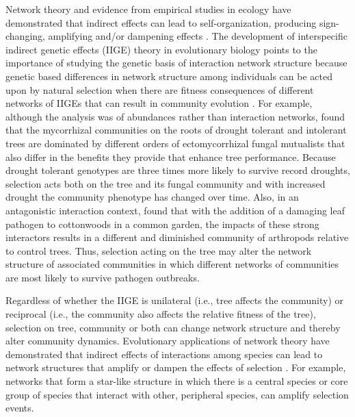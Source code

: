 \documentclass[11pt,twocolumn,twoside,lineno]{pnas-new}
\begin{document}
Network theory and evidence from empirical studies in ecology have
demonstrated that indirect effects can lead to self-organization,
producing sign-changing, amplifying and/or dampening effects
\cite{Newman2006, Sole2006Self-OrganizationEcosystems}. The
development of interspecific indirect genetic effects (IIGE) theory
\cite{Shuster2006COMMUNITYSTRUCTURE} in evolutionary biology points to
the importance of studying the genetic basis of interaction network
structure because genetic based differences in network structure among
individuals can be acted upon by natural selection when there are
fitness consequences of different networks of IIGEs that can result in
community evolution \cite{Whitham2020IntraspecificEvolution}. For
example, although the analysis was of abundances rather than
interaction networks, \citep{Gehring2014PlantChange, Gehring2017a}
found that the mycorrhizal communities on the roots of drought
tolerant and intolerant trees are dominated by different orders of
ectomycorrhizal fungal mutualists that also differ in the benefits
they provide that enhance tree performance. Because drought tolerant
genotypes are three times more likely to survive record droughts,
selection acts both on the tree and its fungal community and with
increased drought the community phenotype has changed over time. Also,
in an antagonistic interaction context, \citep{Busby2015} found that
with the addition of a damaging leaf pathogen to cottonwoods in a
common garden, the impacts of these strong interactors results in a
different and diminished community of arthropods relative to control
trees. Thus, selection acting on the tree may alter the network
structure of associated communities in which different networks of
communities are most likely to survive pathogen outbreaks. 

Regardless of whether the IIGE is unilateral (i.e., tree affects the
community) or reciprocal (i.e., the community also affects the
relative fitness of the tree), selection on tree, community or both
can change network structure \cite{Whitham2020IntraspecificEvolution}
and thereby alter community dynamics.  Evolutionary applications of
network theory have demonstrated that indirect effects of interactions
among species can lead to network structures that amplify or dampen
the effects of selection \cite{Lieberman2005EvolutionaryGraphs}. For
example, networks that form a star-like structure in which there is a
central species or core group of species that interact with other,
peripheral species, can amplify selection events.
\end{document}
